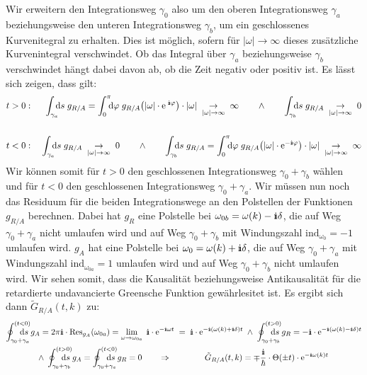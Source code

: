 Wir erweitern den Integrationsweg $\gamma_0$ also um den oberen Integrationsweg $\gamma_a$ beziehungsweise den unteren Integrationsweg $\gamma_b$, um ein geschlossenes Kurvenitegral zu erhalten. Dies ist möglich, sofern für $|\omega|\to\infty$ dieses zusätzliche Kurvenintegral verschwindet. Ob das Integral über $\gamma_a$ beziehungsweise $\gamma_b$ verschwindet hängt dabei davon ab, ob die Zeit negativ oder positiv ist. Es lässt sich zeigen, dass gilt: 
\begin{eqnarray*}
	t>0:&\;&\int_{\gamma_a}\!\!\!\mathrm{d}s\; g_{R/A}=\int_0^{\pi}\!\!\!\mathrm{d}\varphi\;g_{R/A}\big(|\omega|\cdot\e^{\;\I\varphi}\big)\cdot|\omega|\;\underset{|\omega|\to\infty}{\to}\;\infty \qquad\land\qquad \int_{\gamma_b}\!\!\!\mathrm{d}s\; g_{R/A}\;\underset{|\omega|\to\infty}{\to}\;0
	\\\;\\
	t<0:&\;&\int_{\gamma_a}\!\!\!\mathrm{d}s\; g_{R/A}\;\underset{|\omega|\to\infty}{\to}\;0 \qquad\land\qquad \int_{\gamma_b}\!\!\!\mathrm{d}s\; g_{R/A}=\int_0^{\pi}\!\!\!\mathrm{d}\varphi\;g_{R/A}\big(|\omega|\cdot\e^{-\I\varphi}\big)\cdot|\omega|\;\underset{|\omega|\to\infty}{\to}\;\infty
\end{eqnarray*}
Wir können somit für $t>0$ den geschlossenen Integrationsweg $\gamma_0+\gamma_b$ wählen und für $t<0$ den geschlossenen Integrationsweg $\gamma_0+\gamma_a$. Wir müssen nun noch das Residuum für die beiden Integrationswege an den Polstellen der Funktionen $g_{R/A}$ berechnen. Dabei hat $g_R$ eine Polstelle bei $\omega_{0b}=\omega(k)-\I\delta$, die auf Weg $\gamma_0+\gamma_a$ nicht umlaufen wird und auf Weg $\gamma_0+\gamma_b$ mit Windungszahl $\mathrm{ind}_{\omega_0}=-1$ umlaufen wird. $g_A$ hat eine Polstelle bei $\omega_0=\omega(k)+\I\delta$, die auf Weg $\gamma_0+\gamma_a$ mit Windungszahl $\mathrm{ind}_{\omega_{0a}}=1$ umlaufen wird und auf Weg $\gamma_0+\gamma_b$ nicht umlaufen wird. Wir sehen somit, dass die Kausalität beziehungsweise Antikausalität für die retardierte undavancierte Greensche Funktion gewährlesitet ist. Es ergibt sich dann $\tilde{G}_{R/A}(t,k)$ zu: 
\begin{eqnarray*}
	\oint_{\gamma_0+\gamma_a}^{(t<0)}\!\!\!\!\!\!\!\!\!\mathrm{d}s\;g_A = 2\pi\I\cdot\text{Res}_{g_A}(\omega_{0a})= \lim_{\omega\to\omega_{0a}}\;\I\cdot\e^{-\I\omega t}\;=\;\I\cdot\e^{-\I(\omega(k)+\I\delta)t}\;\land\; \oint_{\gamma_0+\gamma_b}^{(t>0)}\!\!\!\!\!\!\!\!\!\mathrm{d}s\;g_R = -\I\cdot\e^{-\I(\omega(k)-\I\delta)t}
	\\
	\land\;\oint_{\gamma_0+\gamma_b}^{(t>0)}\!\!\!\!\!\!\!\!\!\mathrm{d}s\;g_A = \oint_{\gamma_0+\gamma_a}^{(t<0)}\!\!\!\!\!\!\!\!\!\mathrm{d}s\;g_R = 0 \qquad\Rightarrow\qquad\qquad \tilde{G}_{R/A}(t,k) = \mp\frac{\I}{\hbar}\cdot\Theta(\pm t)\cdot \e^{-\I\omega(k) t} \qquad\qquad
\end{eqnarray*}
